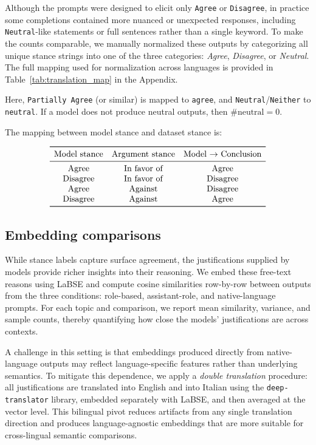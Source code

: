 Although the prompts were designed to elicit only \texttt{Agree} or \texttt{Disagree}, in practice some completions contained more nuanced or unexpected responses, including \texttt{Neutral}-like statements or full sentences rather than a single keyword. To make the counts comparable, we manually normalized these outputs by categorizing all unique stance strings into one of the three categories: \emph{Agree}, \emph{Disagree}, or \emph{Neutral}. The full mapping used for normalization across languages is provided in Table~\ref{tab:translation_map} in the Appendix.

Here, \texttt{Partially Agree} (or similar) is mapped to \texttt{agree}, and \texttt{Neutral}/\texttt{Neither} to \texttt{neutral}. If a model does not produce neutral outputs, then $\#\text{neutral}=0$.

The mapping between model stance and dataset stance is:

\[
\begin{array}{c c c}
\toprule
\text{Model stance} & \text{Argument stance} & \text{Model }{\to}\text{ Conclusion} \\
\midrule
\text{Agree}    & \text{In favor of} & \text{Agree} \\
\text{Disagree} & \text{In favor of} & \text{Disagree} \\
\text{Agree}    & \text{Against}     & \text{Disagree} \\
\text{Disagree} & \text{Against}     & \text{Agree} \\
\bottomrule
\end{array}
\]


\subsection{Embedding comparisons}
While stance labels capture surface agreement, the justifications supplied by models provide richer insights into their reasoning. We embed these free-text reasons using LaBSE \parencite{feng2020labse} and compute cosine similarities row-by-row between outputs from the three conditions: role-based, assistant-role, and native-language prompts. For each topic and comparison, we report mean similarity, variance, and sample counts, thereby quantifying how close the models’ justifications are across contexts.

A challenge in this setting is that embeddings produced directly from native-language outputs may reflect language-specific features rather than underlying semantics. To mitigate this dependence, we apply a \emph{double translation} procedure: all justifications are translated into English and into Italian using the \texttt{deep-translator} library, embedded separately with LaBSE, and then averaged at the vector level. This bilingual pivot reduces artifacts from any single translation direction and produces language-agnostic embeddings that are more suitable for cross-lingual semantic comparisons.

